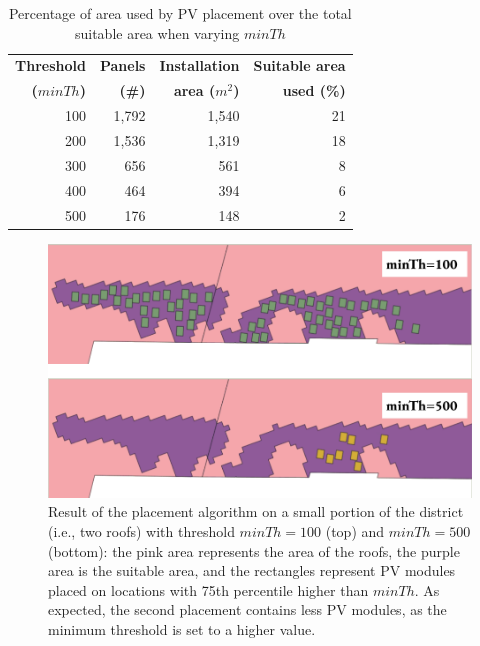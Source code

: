 \begin{table}[!tbp]
\caption{Percentage of area used by PV placement over the total suitable area when varying $minTh$ }
\label{tab:areaused}
\centering
\begin{tabular}{|r|r|r|r|}
\hline
\textbf{Threshold} & \textbf{Panels} &\textbf{Installation} &\textbf{Suitable area} \\
\textbf{($minTh$)} & \textbf{(\#)} &\textbf{area ($m^2$)} &\textbf{used (\%)}\\
\hline\hline
100 & 1,792 & 1,540 & 21 \\\hline
200 & 1,536 & 1,319 & 18 \\\hline
300 & 656 & 561 & 8 \\\hline
400 & 464 & 394 &6 \\\hline
500 & 176 & 148 & 2 \\\hline
\end{tabular}%
\end{table}

\begin{figure}[!tbp]
\centering
\includegraphics[width=0.9\linewidth]{images/100vs500.png}\vspace{-0.4cm}
\caption{{Result of the placement algorithm on a small portion of the district (i.e., two roofs) with threshold $minTh=100$ (top) and $minTh=500$ (bottom): the pink area represents the area of the roofs, the purple area is the suitable area, and the rectangles represent PV modules placed on locations with 75th percentile higher than $minTh$. As expected, the second placement contains less PV modules, as the minimum threshold is set to a higher value. }}
\label{fig:satellizeZoom}
\end{figure}


